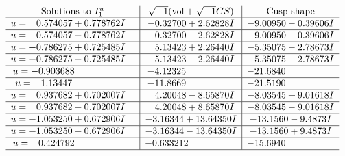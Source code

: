 \documentclass[1p]{elsarticle_modified}
\theoremstyle{definition}
\newcommand{\I}{\sqrt{-1}}
\begin{document}
$$\begin{array}{c|c|c}  
\text{Solutions to }I^u_{1}& \I (\text{vol} + \sqrt{-1}CS) & \text{Cusp shape}\\
 \hline 
\begin{aligned}
u &= \phantom{-}0.574057 + 0.778762 I\end{aligned}
 & -0.32700 + 2.62828 I & -9.00950 - 0.39606 I \\ \hline\begin{aligned}
u &= \phantom{-}0.574057 - 0.778762 I\end{aligned}
 & -0.32700 - 2.62828 I & -9.00950 + 0.39606 I \\ \hline\begin{aligned}
u &= -0.786275 + 0.725485 I\end{aligned}
 & \phantom{-}5.13423 + 2.26440 I & -5.35075 - 2.78673 I \\ \hline\begin{aligned}
u &= -0.786275 - 0.725485 I\end{aligned}
 & \phantom{-}5.13423 - 2.26440 I & -5.35075 + 2.78673 I \\ \hline\begin{aligned}
u &= -0.903688\phantom{ +0.000000I}\end{aligned}
 & -4.12325\phantom{ +0.000000I} & -21.6840\phantom{ +0.000000I} \\ \hline\begin{aligned}
u &= \phantom{-}1.13447\phantom{ +0.000000I}\end{aligned}
 & -11.8669\phantom{ +0.000000I} & -21.5190\phantom{ +0.000000I} \\ \hline\begin{aligned}
u &= \phantom{-}0.937682 + 0.702007 I\end{aligned}
 & \phantom{-}4.20048 - 8.65870 I & -8.03545 + 9.01618 I \\ \hline\begin{aligned}
u &= \phantom{-}0.937682 - 0.702007 I\end{aligned}
 & \phantom{-}4.20048 + 8.65870 I & -8.03545 - 9.01618 I \\ \hline\begin{aligned}
u &= -1.053250 + 0.672906 I\end{aligned}
 & -3.16344 + 13.64350 I & -13.1560 - 9.4873 I \\ \hline\begin{aligned}
u &= -1.053250 - 0.672906 I\end{aligned}
 & -3.16344 - 13.64350 I & -13.1560 + 9.4873 I \\ \hline\begin{aligned}
u &= \phantom{-}0.424792\phantom{ +0.000000I}\end{aligned}
 & -0.633212\phantom{ +0.000000I} & -15.6940\phantom{ +0.000000I}\\
 \hline 
 \end{array}$$\newpage\newpage\renewcommand{\arraystretch}{1}
\end{document}
